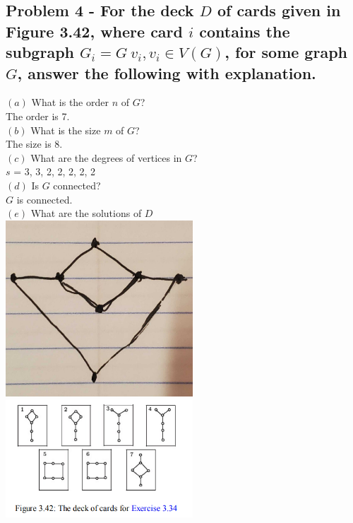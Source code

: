 \documentclass[10pt,a4paper]{article}
\begin{document}
\subsection*{\newpage Problem 4 - For the deck $D$ of cards given in Figure 3.42, where card $i$ contains the subgraph $G_{i} = G \ v_{i}, v_{i} \in V(G)$, for some graph $G$, answer the following with explanation.}


$(a)$ What is the order $n$ of $G$?\\ The order is 7.\\
$(b)$ What is the size $m$ of $G$?\\ The size is 8.\\
$(c)$ What are the degrees of vertices in $G$?\\ $s$ = 3, 3, 2, 2, 2, 2, 2 \\
$(d)$ Is $G$ connected?\\ $G$ is connected.\\
$(e)$ What are the solutions of $D$\\
\includegraphics[width = 7cm]{problem4}\\
\includegraphics[width=7cm]{fig342}
\end{document}
